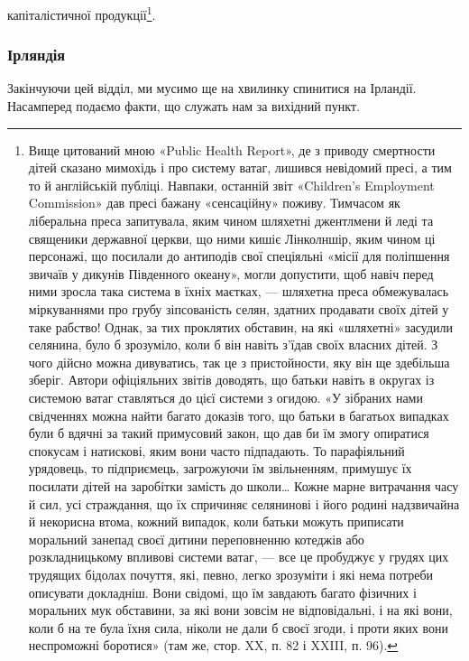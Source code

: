 капіталістичної продукції\footnote{
Вище цитований мною «Public Health Report», де з приводу
смертности дітей сказано мимохідь і про систему ватаг, лишився невідомий
пресі, а тим то й англійській публіці. Навпаки, останній звіт «Children’s
Employment Commission» дав пресі бажану «сенсаційну» поживу.
Тимчасом як ліберальна преса запитувала, яким чином шляхетні джентлмени
й леді та священики державної церкви, що ними кишіє Лінколншір,
яким чином ці персонажі, що посилали до антиподів свої спеціяльні
«місії для поліпшення звичаїв у дикунів Південного океану», могли допустити,
щоб навіч перед ними зросла така система в їхніх маєтках, —
шляхетна преса обмежувалась міркуваннями про грубу зіпсованість
селян, здатних продавати своїх дітей у таке рабство! Однак, за тих проклятих
обставин, на які «шляхетні» засудили селянина, було б зрозуміло,
коли б він навіть з’їдав своїх власних дітей. З чого дійсно можна
дивуватись, так це з пристойности, яку він ще здебільша зберіг. Автори
офіціяльних звітів доводять, що батьки навіть в округах із системою ватаг
ставляться до цієї системи з огидою. «У зібраних нами свідченнях можна
найти багато доказів того, що батьки в багатьох випадках були б вдячні
за такий примусовий закон, що дав би їм змогу опиратися спокусам і
натискові, яким вони часто підпадають. То парафіяльний урядовець,
то підприємець, загрожуючи їм звільненням, примушує їх посилати дітей
на заробітки замість до школи\dots{} Кожне марне витрачання часу й сил,
усі страждання, що їх спричиняє селянинові і його родині надзвичайна
й некорисна втома, кожний випадок, коли батьки можуть приписати
моральний занепад своєї дитини переповненню котеджів або розкладницькому
впливові системи ватаг, — все це пробуджує у грудях цих трудящих
бідолах почуття, які, певно, легко зрозуміти і які нема потреби описувати
докладніш. Вони свідомі, що їм завдають багато фізичних і моральних
мук обставини, за які вони зовсім не відповідальні, і на які вони,
коли б на те була їхня сила, ніколи не дали б своєї згоди, і проти яких
вони неспроможні боротися» (там же, стор. XX, п. 82 і XXIII, п. 96).
}.

\subsubsection{Ірляндія}

Закінчуючи цей відділ, ми мусимо ще на хвилинку спинитися
на Ірландії. Насамперед подаємо факти, що служать нам
за вихідний пункт.
